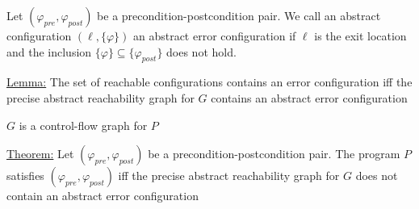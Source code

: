 \documentclass[landscape, a4paper]{article}
\begin{document}
\begin{minipage}[t]{0.2\linewidth}
\begin{betterlist}
\begin{betterlist}
			\item {}
			\begin{betterlist}
				\item {}
			\end{betterlist}
		\end{betterlist}
		\item Let $(\varphi_{pre}, \varphi_{post})$ be a precondition-postcondition pair. We call an abstract configuration $(\ell, \{\varphi\})$ an \alert{abstract error configuration} if $\ell$ is the exit location and the inclusion $\{\varphi\} \subseteq \{\varphi_{post}\}$ does not hold. \script{355}{Example}
		\item \underline{Lemma:} The set of reachable configurations contains an error configuration \alert{iff} the precise abstract reachability graph for $G$ contains an abstract error configuration
		\begin{betterlist}
			\item $G$ is a control-flow graph for $P$
		\end{betterlist}
		\item \underline{Theorem:} Let $(\varphi_{pre}, \varphi_{post})$ be a precondition-postcondition pair. The program $P$ satisfies $(\varphi_{pre}, \varphi_{post})$ iff the precise abstract reachability graph for $G$ does not contain an abstract error configuration
	\end{betterlist}
\end{minipage}
\end{document}
